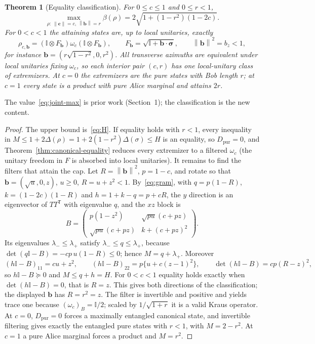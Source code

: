 \documentclass[11pt]{article}
\newtheorem{theorem}{Theorem}[section]
\theoremstyle{remark}\newtheorem{remark}[theorem]{Remark}
\newcommand{\id}{\mathbb I}\newcommand{\ket}[1]{|#1\rangle}
\newcommand{\norm}[1]{\left\lVert#1\right\rVert}
\newcommand{\cv}{\bm c}\newcommand{\av}{\bm a}\newcommand{\bv}{\bm b}
\newcommand{\Dp}{D_{\mathrm{pur}}}
\begin{document}
\begin{theorem}[Equality classification]\label{thm:joint}
For $0\le c\le1$ and $0\le r<1$,
\begin{equation}\label{eq:joint-max}
 \max_{\rho:\ \norm{\cv}=c,\ \norm{\bv}=r}\beta(\rho)=2\sqrt{1+(1-r^2)(1-2c)}.
\end{equation}
For $0<c<1$ the attaining states are, up to local unitaries, exactly
\begin{equation}\label{eq:rho-b}
 \rho_{c,\bv}=(\id\otimes F_{\bv})\omega_c(\id\otimes F_{\bv}),
 \qquad F_{\bv}=\sqrt{\id+\bv\cdot\bm\sigma},\qquad \norm{\bv}^2=b_z<1,
\end{equation}
for instance $\bv=(r\sqrt{1-r^2},0,r^2)$. All transverse azimuths are
equivalent under local unitaries fixing $\omega_c$, so each interior pair
$(c,r)$ has one local-unitary class of extremizers. At $c=0$ the extremizers
are the pure states with Bob length $r$; at $c=1$ every state is a product
with pure Alice marginal and attains $2r$.
\end{theorem}
The value~\eqref{eq:joint-max} is prior work (Section~1); the classification
is the new content.
\begin{proof}
The upper bound is~\eqref{eq:H}. If equality holds with $r<1$, every
inequality in $M\le1+2\Delta(\rho)=1+2(1-r^2)\Delta(\sigma)\le H$ is an
equality, so $\Dp=0$, and Theorem~\ref{thm:canonical-equality} reduces every
extremizer to a filtered $\omega_c$ (the unitary freedom in $F$ is absorbed into
local unitaries). It remains to find the filters that attain the cap. Let
$R=\norm{\bv}^2$, $p=1-c$, and rotate so that $\bv=(\sqrt u,0,z)$, $u\ge0$,
$R=u+z^2<1$. By~\eqref{eq:gram}, with
$q=p(1-R)$, $k=(1-2c)(1-R)$ and $h=1+k-q=p+cR$, the $y$ direction is an
eigenvector of $TT^{\mathsf T}$ with eigenvalue $q$, and the $xz$ block is
\begin{equation}\label{eq:block}
 B=\begin{pmatrix}
 p(1-z^2)&\sqrt{pu}(c+pz)\\
 \sqrt{pu}(c+pz)&k+(c+pz)^2
 \end{pmatrix}.
\end{equation}
Its eigenvalues $\lambda_-\le\lambda_+$ satisfy $\lambda_-\le q\le\lambda_+$,
because $\det(q\id-B)=-cp\,u(1-R)\le0$; hence $M=q+\lambda_+$. Moreover
\begin{equation}\label{eq:factor}
 (h\id-B)_{11}=cu+z^2,\qquad (h\id-B)_{22}=p\{u+c(z-1)^2\},\qquad
 \det(h\id-B)=cp(R-z)^2,
\end{equation}
so $h\id-B\succeq0$ and $M\le q+h=H$. For $0<c<1$ equality holds exactly when
$\det(h\id-B)=0$, that is $R=z$. This gives both directions of the
classification; the displayed $\bv$ has $R=r^2=z$. The filter is invertible
and positive and yields trace one because $(\omega_c)_B=\id/2$; scaled by
$1/\sqrt{1+r}$ it is a valid Kraus operator. At $c=0$, $\Dp=0$ forces a
maximally entangled canonical state, and invertible filtering gives exactly the
entangled pure states with $r<1$, with $M=2-r^2$. At $c=1$ a pure Alice
marginal forces a product and $M=r^2$.
\end{proof}
\end{document}
